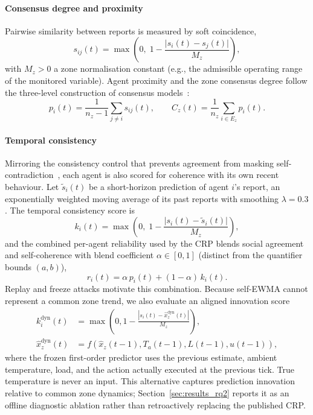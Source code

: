 \documentclass[smartcities,article,submit,moreauthors]{Definitions/mdpi}
\begin{document}
\paragraph{Consensus degree and proximity}
Pairwise similarity between reports is measured by soft coincidence,
\begin{equation}
s_{ij}(t)=\max\!\left(0,\;1-\frac{\lvert s_i(t)-s_j(t)\rvert}{M_z}\right),
\label{eq:similarity}
\end{equation}
with $M_z>0$ a zone normalisation constant (e.g., the admissible
operating range of the monitored variable). Agent proximity and the
zone consensus degree follow the three-level construction of
consensus models~\cite{cabrerizo2009}:
\begin{equation}
p_i(t)=\frac{1}{n_z-1}\sum_{j\neq i}s_{ij}(t),
\qquad
C_z(t)=\frac{1}{n_z}\sum_{i\in E_z}p_i(t).
\label{eq:consensusdegree}
\end{equation}

\paragraph{Temporal consistency}
Mirroring the consistency control that prevents agreement from masking
self-contradiction~\cite{herreraviedma2007,cabrerizo2010kbs}, each agent
is also scored for coherence with its own recent behaviour. Let
$\tilde{s}_i(t)$ be a short-horizon prediction of agent $i$'s report, an
exponentially weighted moving average of its past reports with smoothing
$\lambda=0.3$. The temporal consistency score is
\begin{equation}
k_i(t)=\max\!\left(0,\;1-\frac{\lvert s_i(t)-\tilde{s}_i(t)\rvert}
{M_z}\right),
\label{eq:consistency}
\end{equation}
and the combined per-agent reliability used by the CRP blends social
agreement and self-coherence with blend coefficient
$\alpha\in[0,1]$ (distinct from the quantifier bounds $(a,b)$),
\begin{equation}
r_i(t)=\alpha\, p_i(t) + (1-\alpha)\, k_i(t).
\label{eq:combined}
\end{equation}
Replay and freeze attacks motivate this combination. Because self-EWMA cannot
represent a common zone trend, we also evaluate an aligned innovation score
\begin{equation}
\begin{aligned}
k_i^{\mathrm{dyn}}(t)&=\max\!\left(0,1-
\frac{|s_i(t)-\widehat{x}^{\mathrm{dyn}}_z(t)|}{M_z}\right),\\
\widehat{x}^{\mathrm{dyn}}_z(t)&=
f\!\left(\hat{x}_z(t-1),T_a(t-1),L(t-1),u(t-1)\right),
\end{aligned}
\label{eq:dynamicconsistency}
\end{equation}
where the frozen first-order predictor uses the previous estimate, ambient
temperature, load, and the action actually executed at the previous tick.
True temperature is never an input. This alternative captures prediction
innovation relative to common zone dynamics; Section~\ref{sec:results_rq2}
reports it as an offline diagnostic ablation rather than retroactively
replacing the published CRP.
\end{document}
